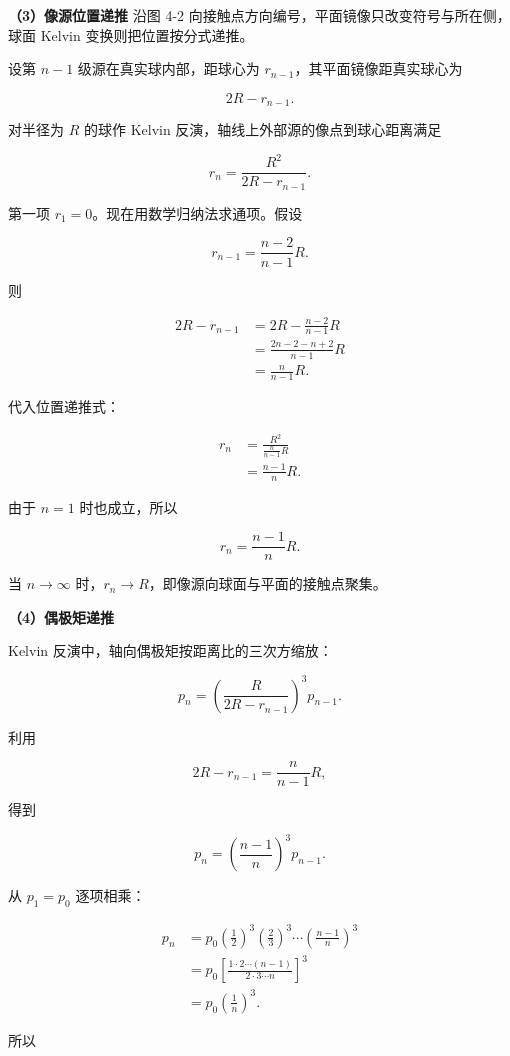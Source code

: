 \documentclass[12pt,a4paper,UTF8]{ctexart}
\begin{document}
\textbf{（3）像源位置递推} 沿图 4-2
向接触点方向编号，平面镜像只改变符号与所在侧，球面 Kelvin
变换则把位置按分式递推。

设第 \(n-1\) 级源在真实球内部，距球心为
\(r_{n-1}\)，其平面镜像距真实球心为

\[2R-r_{n-1}.\]

对半径为 \(R\) 的球作 Kelvin 反演，轴线上外部源的像点到球心距离满足

\[r_n=\frac{R^2}{2R-r_{n-1}}.\]

第一项 \(r_1=0\)。现在用数学归纳法求通项。假设

\[r_{n-1}=\frac{n-2}{n-1}R.\]

则

\[\begin{aligned}
2R-r_{n-1}
&=2R-\frac{n-2}{n-1}R\\
&=\frac{2n-2-n+2}{n-1}R\\
&=\frac{n}{n-1}R.
\end{aligned}\]

代入位置递推式：

\[\begin{aligned}
r_n
&=\frac{R^2}{\frac{n}{n-1}R}\\
&=\frac{n-1}{n}R.
\end{aligned}\]

由于 \(n=1\) 时也成立，所以

\[\boxed{r_n=\frac{n-1}{n}R}.\]

当 \(n\to\infty\) 时，\(r_n\to R\)，即像源向球面与平面的接触点聚集。

\textbf{（4）偶极矩递推}

Kelvin 反演中，轴向偶极矩按距离比的三次方缩放：

\[p_n
=\left(
\frac{R}{2R-r_{n-1}}
\right)^3p_{n-1}.\]

利用

\[2R-r_{n-1}=\frac{n}{n-1}R,\]

得到

\[p_n=\left(\frac{n-1}{n}\right)^3p_{n-1}.\]

从 \(p_1=p_0\) 逐项相乘：

\[\begin{aligned}
p_n
&=p_0
\left(\frac12\right)^3
\left(\frac23\right)^3
\cdots
\left(\frac{n-1}{n}\right)^3\\
&=p_0
\left[
\frac{1\cdot2\cdots(n-1)}
{2\cdot3\cdots n}
\right]^3\\
&=p_0\left(\frac1n\right)^3.
\end{aligned}\]

所以
\end{document}

